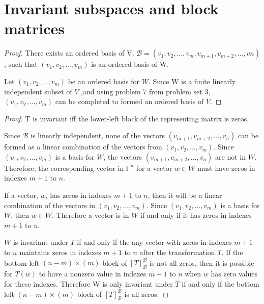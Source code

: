 \section{Invariant subspaces and block matrices}

\begin{proof} There exists an ordered basis of V,
    $\mathcal{B} = (v_1,v_2,...,v_m,v_{m+1},v_{m+2},...,v{n})$,
    such that
    $(v_1,v_2,...,v_m)$
    is an ordered basis of W.\gap

    Let $(v_1,v_2,...,v_m)$ be an ordered basis for $W$.
    Since W is a finite linearly independent subset of $V$
    ,and using problem 7 from problem set 3, 
    $(v_1,v_2,...,v_m)$ can be completed to formed
    an ordered basis of $V$.
\end{proof}

\begin{proof} T is invariant iff the lower-left block of the representing matrix is zeros.\gap
    
    Since $\mathcal{B}$ is linearly independent, 
    none of the vectors $(v_{m+1},v_{m+2},...,v_n)$
    can be formed as a linear combination 
    of the vectors from $(v_1,v_2,...,v_m)$.
    Since $(v_1,v_2,...,v_m)$ is a basis for $W$,
    the vectors $(v_{m+1},v_{m+2},...,v_n)$ 
    are not in $W$. 
    Therefore, the corresponding vector in $\mathbb{F}^n$
    for a vector $w \in W$ must 
    have zeros in indexes $m+1$ to $n$.\gap

    If a vector, $w$, has zeros in indexes $m+1$ to $n$,
    then it will be a linear combination of 
    the vectors in $(v_1,v_2,...,v_m)$.
    Since $(v_1,v_2,...,v_m)$ is a basis for $W$, 
    then $w \in W$.
    Therefore a vector is in $W$ 
    if and only if it has zeros 
    in indexes $m+1$ to $n$.\gap

    $W$ is invariant under $T$ if and only if
    the any vector with zeros in indexes $m+1$ to $n$
    maintains zeros in indexes $m+1$ to $n$ after the transformation $T$.
    If the bottom left $(n-m)\times(m)$ block of $[T]_\mathcal{B}^\mathcal{B}$
    is not all zeros, then it is possible for $T(w)$ to have a nonzero value
    in indexes $m+1$ to $n$ when $w$ has zero values for these indexes.
    Therefore W is only invariant under $T$ if and only if 
    the bottom left $(n-m)\times(m)$ block of 
    $[T]_\mathcal{B}^\mathcal{B}$ is all zeros.
\end{proof}
